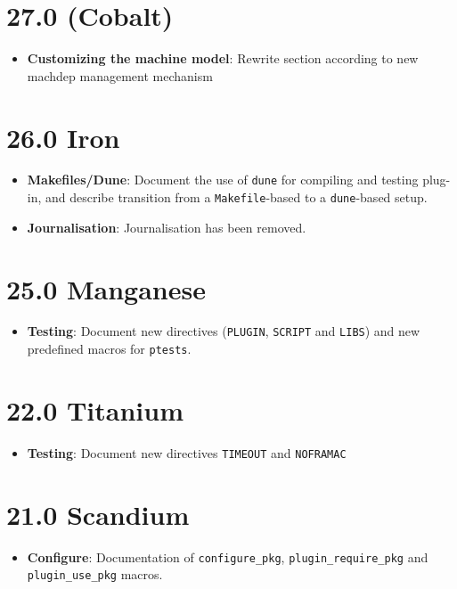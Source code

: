\section*{27.0 (Cobalt)}
\begin{itemize}
\item \textbf{Customizing the machine model}: Rewrite section according to new
  machdep management mechanism
\end{itemize}

\section*{26.0 Iron}
\begin{itemize}
\item \textbf{Makefiles/Dune}: Document the use of \texttt{dune} for compiling
and testing plug-in, and describe transition from a \texttt{Makefile}-based to
a \texttt{dune}-based setup.
\item \textbf{Journalisation}: Journalisation has been removed.
\end{itemize}

\section*{25.0 Manganese}
\begin{itemize}
\item \textbf{Testing}: Document new directives (\texttt{PLUGIN}, \texttt{SCRIPT} and \texttt{LIBS}) and new predefined macros for \texttt{ptests}.
\end{itemize}

\section*{22.0 Titanium}
\begin{itemize}
\item \textbf{Testing}: Document new directives \texttt{TIMEOUT} and
\texttt{NOFRAMAC}
\end{itemize}

\section*{21.0 Scandium}
\begin{itemize}
\item \textbf{Configure}: Documentation of \texttt{configure\_pkg},
\texttt{plugin\_require\_pkg} and \texttt{plugin\_use\_pkg} macros.
\end{itemize}

